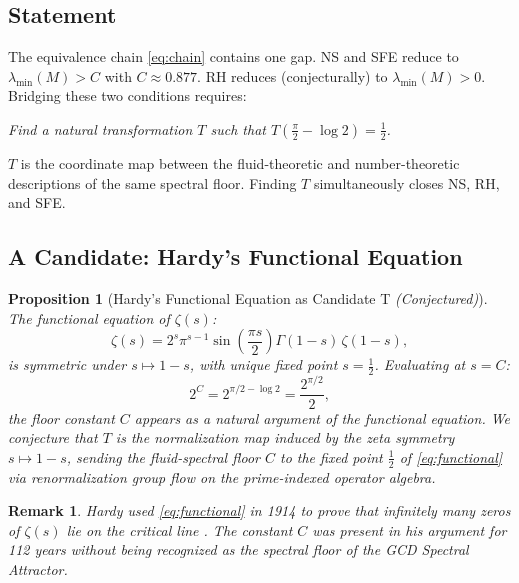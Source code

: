 \documentclass[12pt]{article}
\newtheorem{proposition}[theorem]{Proposition}
\newtheorem{remark}[theorem]{Remark}
\begin{document}
\subsection{Statement}

The equivalence chain \eqref{eq:chain} contains one gap.
NS and SFE reduce to $\lambda_{\min}(M) > C$ with $C \approx 0.877$.
RH reduces (conjecturally) to $\lambda_{\min}(M) > 0$.
Bridging these two conditions requires:

\begin{center}
\textit{Find a natural transformation $T$ such that
$T\!\left(\tfrac{\pi}{2} - \log 2\right) = \tfrac{1}{2}$.}
\end{center}

$T$ is the coordinate map between the fluid-theoretic and
number-theoretic descriptions of the same spectral floor.
Finding $T$ simultaneously closes NS, RH, and SFE.

\subsection{A Candidate: Hardy's Functional Equation}

\begin{proposition}[Hardy's Functional Equation as Candidate T
\emph{(Conjectured)}]
\label{prop:T}
The functional equation of $\zeta(s)$:
\begin{equation}
\zeta(s) = 2^s \pi^{s-1}
\sin\!\!\left(\frac{\pi s}{2}\right)
\Gamma(1-s)\,\zeta(1-s),
\label{eq:functional}
\end{equation}
is symmetric under $s \mapsto 1-s$, with unique fixed
point $s = \tfrac{1}{2}$. Evaluating at $s = C$:
\begin{equation}
2^C = 2^{\pi/2 - \log 2} = \frac{2^{\pi/2}}{2},
\label{eq:2C}
\end{equation}
the floor constant $C$ appears as a natural argument of
the functional equation. We conjecture that $T$ is the
normalization map induced by the zeta symmetry
$s \mapsto 1-s$, sending the fluid-spectral floor $C$
to the fixed point $\tfrac{1}{2}$ of \eqref{eq:functional}
via renormalization group flow on the prime-indexed
operator algebra.
\end{proposition}

\begin{remark}
Hardy used \eqref{eq:functional} in 1914 to prove that
infinitely many zeros of $\zeta(s)$ lie on the critical
line \cite{Hardy1914}. The constant $C$ was present in
his argument for 112 years without being recognized as the
spectral floor of the GCD Spectral Attractor.
\end{remark}
\end{document}

